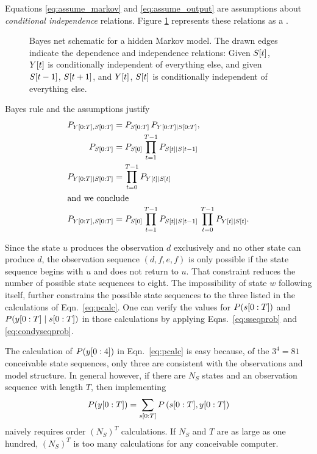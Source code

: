 Equations \eqref{eq:assume_markov} and \eqref{eq:assume_output} are
assumptions about \emph{conditional independence} relations.  Figure
\ref{fig:dhmm_net} represents these relations as a %
\emph{}\cite{Pearl91a}.

\begin{figure}[htbp]
  \centering{\plotsize%
    }
  \caption[Bayes net schematic for a hidden Markov model.]%
  {Bayes net schematic for a hidden Markov model.  The drawn edges
    indicate the dependence and independence relations: Given
    ${S}{[t]}$, ${Y}{[t]}$ is conditionally independent of
    everything else, and given ${S}{[t-1]}$, ${S}{[t+1]}$, and
    ${Y}{[t]}$, ${S}{[t]}$ is conditionally independent of
    everything else.}
  \label{fig:dhmm_net}
\end{figure}

Bayes rule and the assumptions justify
\begin{align}
  P_{\ts{Y}{0}{T},\ts{S}{0}{T}} &= P_{\ts{S}{0}{T}} \, %
                                   P_{\ts{Y}{0}{T}\given \ts{S}{0}{T}},\notag\\
  \label{eq:sseqprob}%
  P_{\ts{S}{0}{T}}              &= P_{\ti{S}{0}} %
                                   \prod_{t=1}^{T-1} P_{\ti{S}{t}\given \ti{S}{t-1}}\\
  \label{eq:condyseqprob}%
  P_{\ts{Y}{0}{T}\given \ts{S}{0}{T}} &= \prod_{t=0}^{T-1} P_{\ti{Y}{t}\given \ti{S}{t}}\\
  \intertext{and we conclude}
  P_{\ts{Y}{0}{T},\ts{S}{0}{T}} &= P_{\ti{S}{0}} %
                                   \prod_{t=1}^{T-1} P_{\ti{S}{t}\given \ti{S}{t-1}}\, %
                                   \prod_{t=0}^{T-1} P_{\ti{Y}{t}\given \ti{S}{t}}.\notag
\end{align}

Since the state $u$ produces the observation $d$ exclusively and no
other state can produce $d$, the observation sequence $(d,f,e,f)$ is
only possible if the state sequence begins with $u$ and does not
return to $u$.  That constraint reduces the number of possible state
sequences to eight.  The impossibility of state $w$ following itself,
further constrains the possible state sequences to the three listed in
the calculations of Eqn.~\eqref{eq:pcalc}.  One can verify the values
for $P(s[0:T])$ and $P(y[0:T]\mid s[0:T])$ in those
calculations by applying Eqns.~\eqref{eq:sseqprob} and
\eqref{eq:condyseqprob}.

The calculation of $P(y[0:4])$ in Eqn.~\eqref{eq:pcalc} is easy
because, of the $3^4 = 81$ conceivable state sequences, only three are
consistent with the observations and model structure.  In general
however, if there are $N_S$ states and an observation sequence with
length $T$, then implementing
\begin{equation*}
  P(y[0:T]) = \sum_{s[0:T]} P\left(s[0:T]
    ,y[0:T] \right)
\end{equation*}
naively requires order $\left(N_S\right)^T$ calculations.  If $N_S$
and $T$ are as large as one hundred, $\left(N_S\right)^T$ is too many
calculations for any conceivable computer.

